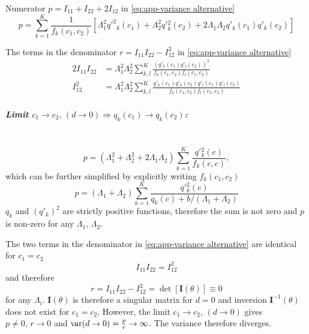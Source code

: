 Numerator $p=I_{11}+I_{22}+2I_{12}$ in \autoref{eq:app-variance alternative}
\begin{equation}
	p=\sum_{k=1}^K\frac{1}{f_k(c_1,c_2)}\left[\Lambda_1^2q'^2{}_k(c_1)+\Lambda_2^2q'{}_k^2(c_2)+2\Lambda_1\Lambda_2q'_k(c_1)q'_k(c_2)\right]
\end{equation}

The terms in the denominator $r=I_{11}I_{22}-I_{12}^2$ in \autoref{eq:app-variance alternative}
%
\begin{alignat}{2}
	I_{11}I_{22} & =\Lambda_1^2\Lambda_2^2\sum_{k,l}^K\frac{\left(q'_k(c_1)q'_l(c_2)\right)^2}{f_k(c_1,c_2)f_l(c_1,c_2)}\\
	I_{12}^2 & =\Lambda_1^2\Lambda_2^2\sum_{k,l}^K\frac{q'_k(c_1)q'_k(c_2)q'_l(c_1)q'_l(c_2)}{f_k(c_1,c_2)f_l(c_1,c_2)}
\end{alignat}

\subparagraph*{Limit $c_1\rightarrow c_2,\,(d\rightarrow0)\Rightarrow q_k(c_1)\rightarrow q_k(c_2)$:}\ \\
%
\begin{equation}
	p=(\Lambda_1^2+\Lambda_2^2+2\Lambda_1\Lambda_2)\sum_{k=1}^K\frac{q'{}_k^2(c)}{f_k(c,c)},
\end{equation}
%
which can be further simplified by explicitly writing $f_k(c_1,c_2)$
%
\begin{equation}
	p=(\Lambda_1+\Lambda_2)\sum_{k=1}^K\frac{q'{}_k^2(c)}{q_k(c)+b/(\Lambda_1+\Lambda_2)}
\end{equation}
%
$q_k$ and $(q'_k)^2$ are strictly positive functions, therefore the sum is not zero and $p$ is non-zero for any $\Lambda_1,\,\Lambda_2$. 

The two terms in the denominator in \autoref{eq:app-variance alternative} are identical for $c_1=c_2$
\begin{equation}
	I_{11}I_{22}=I_{12}^2
\end{equation}
%
and therefore 
%
\begin{equation}
	r=I_{11}I_{22}-I_{12}^2=\det\left[\bm{I}(\theta)\right] \equiv 0
\end{equation}
%
for any $\Lambda_i$. $\bm{I}(\theta)$ is therefore a singular matrix for $d=0$ and inversion $\bm{I}^{-1}(\theta)$ does not exist for $c_1=c_2$. However,  the limit $c_1\rightarrow c_2,\,(d\rightarrow0)$ gives $p\neq0,\, r\rightarrow0$ and $\mathrm{var}(d\rightarrow0)=\frac{p}{r}\rightarrow\infty$. The variance therefore diverges. 

